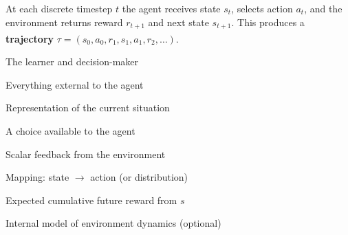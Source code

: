 \begin{tcbitemize}[ skin=sectionraster ]
        \tcbitem[title={Agent--Environment Interaction Loop}, raster multicolumn=6]
        At each discrete timestep $t$ the agent receives state $s_t$, selects
        action $a_t$, and the environment returns reward $r_{t+1}$ and next
        state $s_{t+1}$. This produces a \textbf{trajectory}
        $\tau = (s_0, a_0, r_1, s_1, a_1, r_2, \ldots)$.%
        \textsuperscript{\cite[][p.~325]{hurbansGrokkingArtificialIntelligence2020}}
        \tcblower
        \begin{center}
\label{fig:ch07-reinforcement-learning-inline-01}
        \end{center}

        \tcbitem[title=Core Components, raster multicolumn=3]
        \begin{description}[leftmargin=0.5cm, labelindent=0pt]
            \item[\textbf{Agent}] The learner and decision-maker
            \item[\textbf{Environment}] Everything external to the agent
            \item[\textbf{State $s$}] Representation of the current situation
            \item[\textbf{Action $a$}] A choice available to the agent
            \item[\textbf{Reward $r$}] Scalar feedback from the environment
            \item[\textbf{Policy $\pi$}] Mapping: state $\to$ action (or distribution)
            \item[\textbf{Value $V(s)$}] Expected cumulative future reward from $s$
            \item[\textbf{Model}] Internal model of environment dynamics (optional)
        \end{description}
        \textsuperscript{\cite[][p.~326]{hurbansGrokkingArtificialIntelligence2020}}


\end{tcbitemize}
